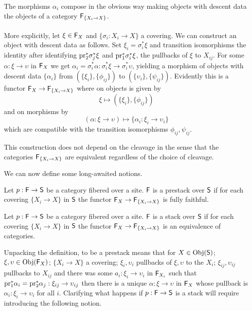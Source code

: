 The morphisms $\alpha_{i}$ compose in the obvious way making objects with descent data the objects of a category $\mathsf{F}_{\{X_{i}\to X\}}$. 
\\\\
More explicitly, let $\xi\in\mathsf{F}_{X}$ and $\{\sigma_{i}:X_{i}\to X\}$ a covering. We can construct an object with descent data as follows. Set $\xi_{i}=\sigma_{i}^{*}\xi$ and transition isomorphisms the identity after identifying $\mathrm{pr}_{2}^{*}\sigma_{j}^{*}\xi$ and $\mathrm{pr}_{1}^{*}\sigma_{i}^{*}\xi$, the pullbacks of $\xi$ to $X_{ij}$. For some $\alpha:\xi\to\upsilon$ in $\mathsf{F}_{X}$ we get $\alpha_{i}=\sigma_{i}^{*}\alpha:\sigma_{i}^{*}\xi\to\sigma_{i}^{*}\upsilon$, yielding a morphism of objects with descent data $\{\alpha_{i}\}$ from $(\{\xi_{i}\},\{\phi_{ij}\})$ to $(\{\upsilon_{i}\},\{\psi_{ij}\})$. Evidently this is a functor $\mathsf{F}_{X}\to\mathsf{F}_{\{X_{i}\to X\}}$ where on objects is given by 
$$\xi\mapsto(\{\xi_{i}\},\{\phi_{ij}\})$$
and on morphisms by 
$$(\alpha:\xi\to\upsilon)\mapsto \{\alpha_{i}:\xi_{i}\to\upsilon_{i}\}$$
which are compatible with the transition isomorphisms $\phi_{ij},\psi_{ij}$. 
\begin{remark}
    This construction does not depend on the cleavage in the sense that the categories $\mathsf{F}_{\{X_{i}\to X\}}$ are equivalent regardless of the choice of cleavage.
\end{remark}
We can now define some long-awaited notions. 
\begin{definition}[Prestack]\label{def: categorical prestack}
    Let $p:\mathsf{F}\to\mathsf{S}$ be a category fibered over a site. $\mathsf{F}$ is a prestack over $\mathsf{S}$ if for each covering $\{X_{i}\to X\}$ in $\mathsf{S}$ the functor $\mathsf{F}_{X}\to\mathsf{F}_{\{X_{i}\to X\}}$ is fully faithful. 
\end{definition}
\begin{definition}[Stack]\label{def: categorical stack}
    Let $p:\mathsf{F}\to\mathsf{S}$ be a category fibered over a site. $\mathsf{F}$ is a stack over $\mathsf{S}$ if for each covering $\{X_{i}\to X\}$ in $\mathsf{S}$ the functor $\mathsf{F}_{X}\to\mathsf{F}_{\{X_{i}\to X\}}$ is an equivalence of categories. 
\end{definition}
Unpacking the definition, to be a prestack means that for $X\in\mathrm{Obj}(\mathsf{S})$; $\xi,\upsilon\in\mathrm{Obj}(\mathsf{F}_{X})$; $\{X_{i}\to X\}$ a covering; $\xi_{i},\upsilon_{i}$ pullbacks of $\xi,\upsilon$ to the $X_{i}$; $\xi_{ij},\upsilon_{ij}$ pullbacks to $X_{ij}$ and there was some $a_{i}:\xi_{i}\to\upsilon_{i}$ in $\mathsf{F}_{X_{i}}$ such that $\mathrm{pr}_{1}^{*}\alpha_{i}=\mathrm{pr}_{2}^{*}\alpha_{j}:\xi_{ij}\to\upsilon_{ij}$ then there is a unique $\alpha:\xi\to\upsilon$ in $\mathsf{F}_{X}$ whose pullback is $\alpha_{i}:\xi_{i}\to\upsilon_{i}$ for all $i$. Clarifying what happens if $p:\mathsf{F}\to\mathsf{S}$ is a stack will require introducing the following notion. 
